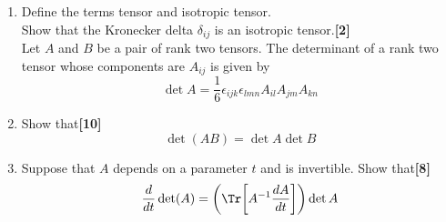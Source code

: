 \documentclass[a4paper]{article}
\begin{document}
\newpage
\begin{qns}[Tensors]\leavevmode
\begin{enumerate}[label=(\roman*)]
\item Define the terms tensor and isotropic tensor.\\[5pt]
Show that the Kronecker delta $\delta_{ij}$ is an isotropic tensor.\hfill\textbf{[2]}\\[5pt]
Let $A$ and $B$ be a pair of rank two tensors. The determinant of a rank two tensor whose components are $A_{ij}$ is given by
$$\det A =\frac{1}{6}\epsilon_{ijk}\epsilon_{lmn}A_{il}A_{jm}A_{kn}$$
\item Show that\hfill\textbf{[10]}
$$\det(AB) = \det A \det B$$
\item Suppose that $A$ depends on a parameter $t$ and is invertible. Show that\hfill\textbf{[8]}
$$\frac{d}{dt}\det(A)=\bigg(\Tr \bigg[A^{-1}\frac{dA}{dt}\bigg]\bigg)\det A$$
\end{enumerate}
\end{qns}
\end{document}
